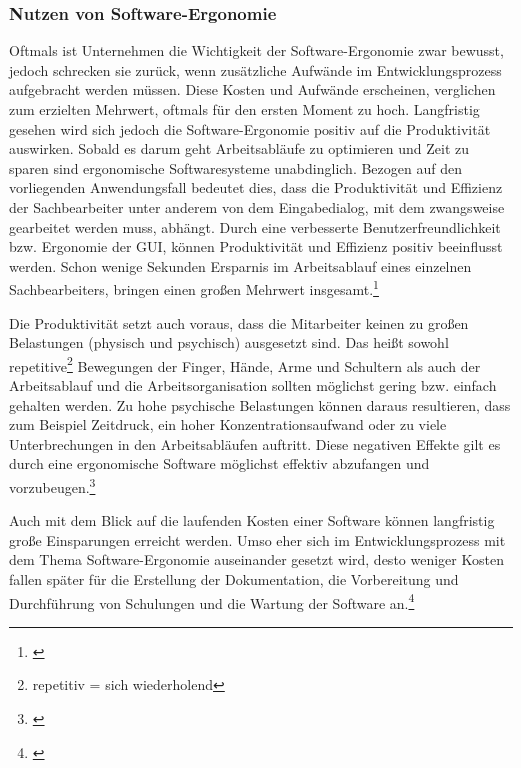 
\subsubsection{Nutzen von Software-Ergonomie}
Oftmals ist Unternehmen die Wichtigkeit der Software-Ergonomie zwar bewusst, jedoch schrecken sie zurück, wenn zusätzliche Aufwände im Entwicklungsprozess aufgebracht werden müssen. Diese Kosten und Aufwände erscheinen, verglichen zum erzielten Mehrwert, oftmals für den ersten Moment zu hoch. Langfristig gesehen wird sich jedoch die Software-Ergonomie positiv auf die Produktivität auswirken. Sobald es darum geht Arbeitsabläufe zu optimieren und Zeit zu sparen sind ergonomische Softwaresysteme unabdinglich. Bezogen auf den vorliegenden Anwendungsfall bedeutet dies, dass die Produktivität und Effizienz der Sachbearbeiter unter anderem von dem Eingabedialog, mit dem zwangsweise gearbeitet werden muss, abhängt. Durch eine verbesserte Benutzerfreundlichkeit bzw. Ergonomie der \gls{GUI}, können Produktivität und Effizienz positiv beeinflusst werden. Schon wenige Sekunden Ersparnis im Arbeitsablauf eines einzelnen Sachbearbeiters, bringen einen großen Mehrwert insgesamt.\footnote{\cite[vgl.][19]{Pruemper_Harten2007}}

Die Produktivität setzt auch voraus, dass die Mitarbeiter keinen zu großen Belastungen (physisch und psychisch) ausgesetzt sind. Das heißt sowohl repetitive\footnote{repetitiv = sich wiederholend} Bewegungen der Finger, Hände, Arme und Schultern als auch der Arbeitsablauf und die Arbeitsorganisation sollten möglichst gering bzw. einfach gehalten werden. Zu hohe psychische Belastungen können daraus resultieren, dass zum Beispiel Zeitdruck, ein hoher Konzentrationsaufwand oder zu viele Unterbrechungen in den Arbeitsabläufen auftritt. Diese negativen Effekte gilt es durch eine ergonomische Software möglichst effektiv abzufangen und vorzubeugen.\footnote{\cite[vgl.][19]{Pruemper_Harten2007}}

Auch mit dem Blick auf die laufenden Kosten einer Software können langfristig große Einsparungen erreicht werden. Umso eher sich im Entwicklungsprozess mit dem Thema Software-Ergonomie auseinander gesetzt wird, desto weniger Kosten fallen später für die Erstellung der Dokumentation, die Vorbereitung und Durchführung von Schulungen und die Wartung der Software an.\footnote{\cite[vgl.][19]{Pruemper_Harten2007}}


